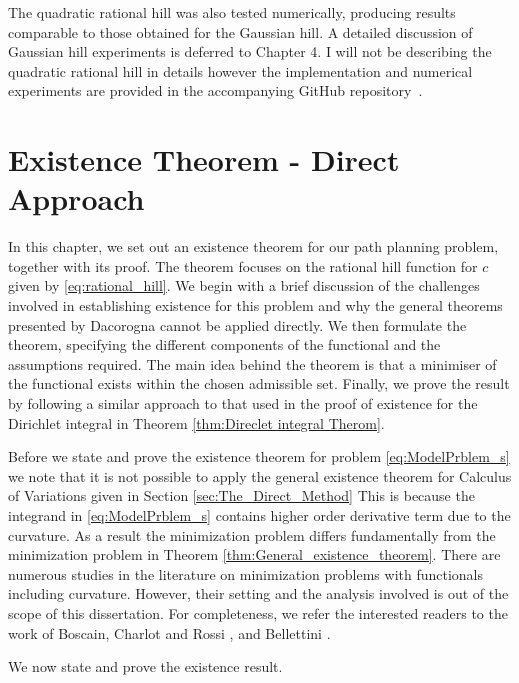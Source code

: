 The quadratic rational hill was also tested numerically, producing results comparable to those obtained for the Gaussian hill. A detailed discussion of Gaussian hill experiments is deferred to Chapter 4. I will not be describing the quadratic rational hill in details however the implementation and numerical experiments are provided in the accompanying GitHub repository~\cite{skerman2026calculus}.


\section{Existence Theorem - Direct Approach}

In this chapter, we set out an existence theorem for our path planning problem, together with its proof. The theorem focuses on the rational hill function for $c$ given by \eqref{eq:rational_hill}. We begin with a brief discussion of the challenges involved in establishing existence for this problem and why the general theorems presented by Dacorogna cannot be applied directly. We then formulate the theorem, specifying the different components of the functional and the assumptions required. The main idea behind the theorem is that a minimiser of the functional exists within the chosen admissible set. Finally, we prove the result by following a similar approach to that used in the proof of existence for the Dirichlet integral in Theorem \ref{thm:Direclet integral Therom}.


\begin{remark}
    Before we state and prove the existence theorem for problem \eqref{eq:ModelPrblem_s} we note that it is not possible to apply the general existence theorem for Calculus of Variations given in Section \ref{sec:The_Direct_Method} This is because the integrand in \eqref{eq:ModelPrblem_s} contains higher order derivative term due to the curvature. As a result the minimization problem differs fundamentally from the minimization problem in Theorem \ref{thm:General_existence_theorem}. There are numerous studies in the literature on minimization problems with functionals including curvature. However, their setting and the analysis involved is out of the scope of this dissertation. For completeness, we refer the interested readers to the work of Boscain, Charlot and Rossi \cite{BoscainCharlotRossi}, and Bellettini \cite{Bellettini}.
\end{remark}


We now state and prove the existence result. 

